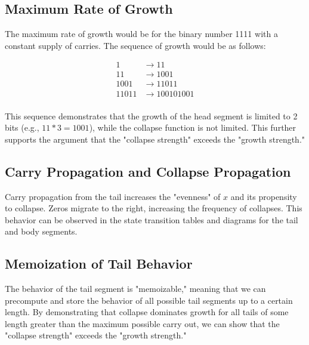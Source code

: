 \documentclass{article}
\begin{document}
\subsection{Maximum Rate of Growth}
The maximum rate of growth would be for the binary number 1111 with a constant supply of carries. The sequence of growth would be as follows:

\begin{align*}
    1 & \rightarrow 11 \\
    11 & \rightarrow 1001 \\
    1001 & \rightarrow 11011 \\
    11011 & \rightarrow 100101001 \\
\end{align*}

This sequence demonstrates that the growth of the head segment is limited to 2 bits (e.g., $11 * 3 = 1001$), while the collapse function is not limited. This further supports the argument that the "collapse strength" exceeds the "growth strength."

\subsection{Carry Propagation and Collapse Propagation}
Carry propagation from the tail increases the "evenness" of $x$ and its propensity to collapse. Zeros migrate to the right, increasing the frequency of collapses. This behavior can be observed in the state transition tables and diagrams for the tail and body segments.

\subsection{Memoization of Tail Behavior}
The behavior of the tail segment is "memoizable," meaning that we can precompute and store the behavior of all possible tail segments up to a certain length. By demonstrating that collapse dominates growth for all tails of some length greater than the maximum possible carry out, we can show that the "collapse strength" exceeds the "growth strength."
\end{document}
